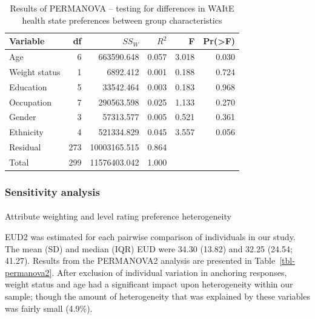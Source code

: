 \documentclass[
  letterpaper,
  DIV=11,
  numbers=noendperiod]{scrartcl}
\makeatletter
\let\oldparagraph\paragraph
\renewcommand{\paragraph}{
    \@ifstar
      \xxxParagraphStar
      \xxxParagraphNoStar
  }
\newcommand{\xxxParagraphStar}[1]{\oldparagraph*{#1}\mbox{}}
\newcommand{\xxxParagraphNoStar}[1]{\oldparagraph{#1}\mbox{}}
\makeatother
\begin{document}
\begin{longtable}[]{@{}lrrrrr@{}}

\caption{\label{tbl-permanova}Results of PERMANOVA -- testing for
differences in WAItE health state preferences between group
characteristics}

\tabularnewline

\toprule\noalign{}
Variable & df & \(SS_W\) & \(R^2\) & F & Pr(\textgreater F) \\
\midrule\noalign{}
\endhead
\bottomrule\noalign{}
\endlastfoot
Age & 6 & 663590.648 & 0.057 & 3.018 & 0.030 \\
Weight status & 1 & 6892.412 & 0.001 & 0.188 & 0.724 \\
Education & 5 & 33542.464 & 0.003 & 0.183 & 0.968 \\
Occupation & 7 & 290563.598 & 0.025 & 1.133 & 0.270 \\
Gender & 3 & 57313.577 & 0.005 & 0.521 & 0.361 \\
Ethnicity & 4 & 521334.829 & 0.045 & 3.557 & 0.056 \\
Residual & 273 & 10003165.515 & 0.864 & & \\
Total & 299 & 11576403.042 & 1.000 & & \\

\end{longtable}

\subsubsection{Sensitivity analysis}\label{sensitivity-analysis}

\paragraph{Attribute weighting and level rating preference
heterogeneity}\label{attribute-weighting-and-level-rating-preference-heterogeneity}

EUD2 was estimated for each pairwise comparison of individuals in our
study. The mean (SD) and median (IQR) EUD were 34.30 (13.82) and 32.25
(24.54; 41.27). Results from the PERMANOVA2 analysis are presented in
Table~\ref{tbl-permanova2}. After exclusion of individual variation in
anchoring responses, weight status and age had a significant impact upon
heterogeneity within our sample; though the amount of heterogeneity that
was explained by these variables was fairly small (4.9\%).
\end{document}
